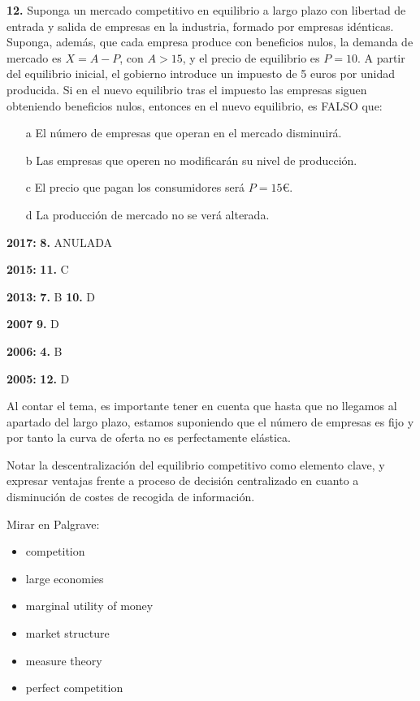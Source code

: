 \documentclass{nuevotema}
\begin{document}

\textbf{12.} Suponga un mercado competitivo en equilibrio a largo plazo con libertad de entrada y salida de empresas en la industria, formado por empresas idénticas. Suponga, además, que cada empresa produce con beneficios nulos, la demanda de mercado es $X = A - P$, con $A > 15$, y el precio de equilibrio es $P=10$. A partir del equilibrio inicial, el gobierno introduce un impuesto de 5 euros por unidad producida. Si en el nuevo equilibrio tras el impuesto las empresas siguen obteniendo beneficios nulos, entonces en el nuevo equilibrio, es FALSO que:

\begin{itemize}
	\item[a] El número de empresas que operan en el mercado disminuirá.
	\item[b] Las empresas que operen no modificarán su nivel de producción.
	\item[c] El precio que pagan los consumidores será $P= 15 €$.
	\item[d] La producción de mercado no se verá alterada.
\end{itemize}

\notas

\textbf{2017:} \textbf{8.} ANULADA

\textbf{2015:} \textbf{11.} C

\textbf{2013:} \textbf{7.} B \textbf{10.} D

\textbf{2007} \textbf{9.} D

\textbf{2006:} \textbf{4.} B

\textbf{2005:} \textbf{12.} D

Al contar el tema, es importante tener en cuenta que hasta que no llegamos al apartado del largo plazo, estamos suponiendo que el número de empresas es fijo y por tanto la curva de oferta no es perfectamente elástica. 

Notar la descentralización del equilibrio competitivo como elemento clave, y expresar ventajas frente a proceso de decisión centralizado en cuanto a disminución de costes de recogida de información.

\bibliografia

Mirar en Palgrave:
\begin{itemize}
	\item competition
	\item large economies
	\item marginal utility of money
	\item market structure
	\item measure theory
	\item perfect competition
\end{itemize}
\end{document}
